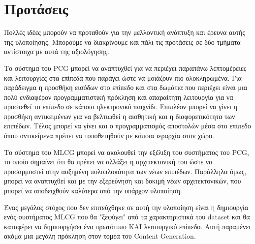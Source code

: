 \section{Προτάσεις}
\par
Πολλές ιδέες μπορούν να προταθούν για την μελλοντική ανάπτυξη και έρευνα αυτής της υλοποίησης. Μπορούμε να διακρίνουμε και πάλι τις προτάσεις σε δύο τμήματα  αντίστοιχα με αυτά της αξιολόγησης.
\par
Το σύστημα του PCG μπορεί να αναπτυχθεί για να περιέχει παραπάνω λεπτομέρειες και λειτουργίες στα επίπεδα που παράγει ώστε να μοιάζουν πιο ολοκληρωμένα. Για παράδειγμα η προσθήκη εισόδων στο επίπεδο και στα δωμάτια που περιέχει είναι μια πολύ ενδιαφέρον προγραμματιστική πρόκληση και απαραίτητη λειτουργία για να προστεθεί το επίπεδο σε κάποιο ηλεκτρονικό παιχνίδι. Επιπλέον μπορεί να γίνει η προσθήκη αντικειμένων για να βελτιωθεί η αισθητική και η διαφορετικότητα των επιπέδων. Τέλος μπορεί να γίνει και ο προγραμματισμός αποστολών μέσα στο επίπεδο όπου αντικείμενα πρέπει να τοποθετηθούν με κάποια ιεραρχία στον χώρο.
\par
Το σύστημα του MLCG μπορεί να ακολουθεί την εξέλιξη του συστήματος του PCG, το οποίο σημαίνει ότι θα πρέπει να αλλάξει η αρχιτεκτονική του ώστε να προσαρμοστεί στην αυξημένη πολυπλοκότητα των νέων επιπέδων. Παράλληλα όμως, μπορεί να αναπτυχθεί και με την εξερεύνηση και δοκιμή νέων αρχιτεκτονικών, που μπορεί να αποδειχθούν καλύτερα από την υπάρχον υλοποίηση.
\par
Ένας μεγάλος στόχος που δεν επιτεύχθηκε σε αυτή την υλοποίηση είναι η δημιουργία ενός συστήματος MLCG που θα "ξεφύγει" από τα χαρακτηριστικά του dataset και θα καταφέρει να δημιουργήσει ένα πρωτότυπο ΚΑΙ λειτουργικό επίπεδο. Αυτή παραμένει ακόμα μια μεγάλη πρόκληση στον τομέα του Content Generation.









